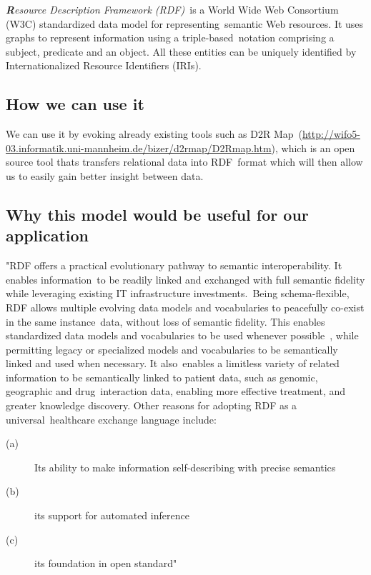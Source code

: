 \documentclass[DIV=calc, paper=a4, fontsize=12pt, onecolumn]{scrartcl}	 %
\newcommand{\initial}[1]{ %
\lettrine[lines=3,lhang=0.3,nindent=0em,slope=0em]{
\color{DarkBlue}
{\textbf{\textit{#1}}}}{}}
\begin{document}
\initial{R}\textit{esource Description Framework (RDF)}\
is a World Wide Web Consortium (W3C) standardized data model for representing\
semantic Web resources. It uses graphs to represent information using a triple-based\
 notation comprising a subject, predicate and an object. All these entities can be uniquely identified by Internationalized Resource Identifiers (IRIs).\
  \cite{pathak_applying_2012}

\subsection{How we can use it}

We can use it by evoking already existing tools such as D2R Map\
  (\url{http://wifo5-03.informatik.uni-mannheim.de/bizer/d2rmap/D2Rmap.htm}),
 which is an open source tool thats transfers relational data into RDF\
 format which will then allow us to easily gain better insight between data.\

\subsection{Why this model would be useful for our application}

"RDF offers a practical evolutionary pathway to semantic interoperability. It enables information\
 to be readily linked and exchanged with full semantic fidelity while leveraging existing IT infrastructure investments.\
 Being schema-flexible, RDF allows multiple evolving data models and vocabularies to peacefully co-exist in the same instance\
data, without loss of semantic fidelity. This enables standardized data models and vocabularies to be used whenever possible\
, while permitting legacy or specialized models and vocabularies to be semantically linked and used when necessary. It also\
 enables a limitless variety of related information to be semantically linked to patient data, such as genomic, geographic and drug\
 interaction data, enabling more effective treatment, and greater knowledge discovery. Other reasons for adopting RDF as a universal\
 healthcare exchange language include:

\begin{description}
\item[(a)]  Its ability to make information self-describing with precise semantics
\item[(b)] its support for automated inference
\item[(c)]  its foundation in open standard"
\end{description}
\end{document}
